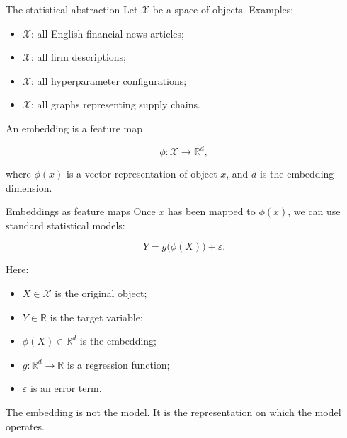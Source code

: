 \documentclass[aspectratio=169]{beamer}
\newcommand{\R}{\mathbb{R}}
\begin{document}
\begin{frame}{The statistical abstraction}
\large
Let \(\mathcal{X}\) be a space of objects. Examples:

\vspace{0.2cm}

\begin{itemize}
  \item \(\mathcal{X}\): all English financial news articles;
  \item \(\mathcal{X}\): all firm descriptions;
  \item \(\mathcal{X}\): all hyperparameter configurations;
  \item \(\mathcal{X}\): all graphs representing supply chains.
\end{itemize}

\vspace{0.3cm}

An embedding is a feature map

\[
\phi : \mathcal{X} \longrightarrow \R^d,
\]

where \(\phi(x)\) is a vector representation of object \(x\), and \(d\) is the embedding dimension.
\end{frame}

\begin{frame}{Embeddings as feature maps}
\large
Once \(x\) has been mapped to \(\phi(x)\), we can use standard statistical models:

\[
Y = g\big(\phi(X)\big) + \varepsilon.
\]

\vspace{0.2cm}

Here:
\begin{itemize}
  \item \(X \in \mathcal{X}\) is the original object;
  \item \(Y \in \R\) is the target variable;
  \item \(\phi(X) \in \R^d\) is the embedding;
  \item \(g : \R^d \to \R\) is a regression function;
  \item \(\varepsilon\) is an error term.
\end{itemize}

\vspace{0.2cm}

\begin{bluebox}
The embedding is not the model. It is the representation on which the model operates.
\end{bluebox}
\end{frame}
\end{document}
